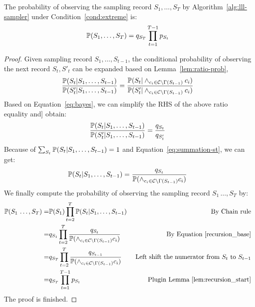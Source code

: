\begin{lemma} \label{lem:sample-record}
The probability of observing the sampling record  $S_1,\ldots,S_T$ by Algorithm~\ref{alg:lll-sampler} under Condition~\ref{cond:extreme} is:
\begin{equation}\label{pS_final}
    \mathbb{P}(S_1,\ldots ,S_T)=q_{S_T} \prod_{t=1}^{T-1} p_{S_t} 
\end{equation}
\begin{proof}
Given sampling record  $S_1,\ldots,S_{t-1}$, the conditional probability of observing the next record {$S_t,S'_t$} can be expanded  based on Lemma~\ref{lem:ratio-prob},
\begin{equation*}
\frac{\mathbb{P}(S_t | S_1, \ldots, S_{t-1})}{\mathbb{P}(S'_t | S_1, \ldots, S_{t-1})}=\frac{\mathbb{P}(S_t |\wedge_{c_i \in \mathcal{C}\backslash \Gamma(S_{t-1})}c_i)}{\mathbb{P}(S'_t |\wedge_{c_i \in \mathcal{C}\backslash \Gamma(S_{t-1})}c_i)}
\end{equation*}
Based on Equation~\eqref{eq:bayes}, we {can simplify the RHS of the above ratio equality and}] obtain:
\begin{equation*}
\frac{\mathbb{P}(S_t | S_1, \ldots, S_{t-1})}{\mathbb{P}(S'_t | S_1, \ldots, S_{t-1})}=\frac{q_{S_t}}{q_{S'_t}}
\end{equation*}
Because of $\sum_{S_t}\mathbb{P}(S_t | S_1, \ldots, S_{t-1})=1$ and Equation~\eqref{eq:summation-st}, we can get:
\begin{equation}\label{recursion_base}
  \mathbb{P}(S_t | S_1, \ldots, S_{t-1})=  \frac{q_{S_t}}{\mathbb{P}(\wedge_{c_i \in \mathcal{C}\backslash \Gamma(S_{t-1})}c_i)}
\end{equation}
We finally compute the probability of observing the sampling record $S_1\,\ldots, S_T$ by:
\begin{equation*}
\begin{aligned} 
    \mathbb{P}(S_1\,\ldots ,S_T)=&   \mathbb{P}(S_1)\prod_{t=2}^T\mathbb{P}(S_t | S_1,\ldots,S_{t-1})  &\text{ By Chain rule}\\
    =&q_{S_1}\prod_{t=2}^T \frac{q_{S_t}}{\mathbb{P}(\wedge_{c_i \in \mathcal{C}\backslash \Gamma(S_{t-1})}c_i)}  &\text{ By Equation~\eqref{recursion_base}}\\
    =&q_{S_T} \prod_{t=2}^T \frac{q_{S_{t-1}}}{\mathbb{P}(\wedge_{c_i \in \mathcal{C}\backslash \Gamma(S_{t-1})}c_i)}  &\text{ Left shift the numerator from $S_t$ to $S_{t-1}$}\\
    =&q_{S_T} \prod_{t=1}^{T-1} p_{S_t} & \text{Plugin  Lemma~\ref{lem:recursion_start}}
\end{aligned}    
\end{equation*}
The proof is finished.
\end{proof}
\end{lemma}




